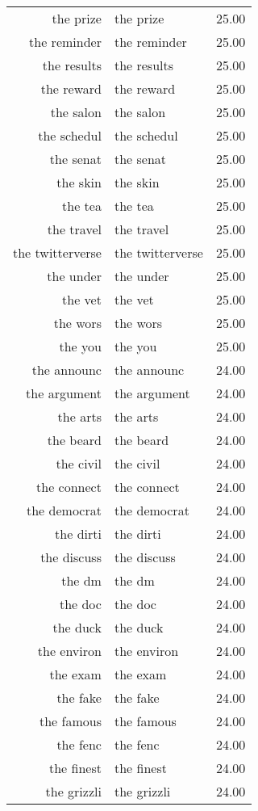 \begin{table}[ht]
\begin{tabular}{rlr}
  the prize & the prize & 25.00 \\ 
  the reminder & the reminder & 25.00 \\ 
  the results & the results & 25.00 \\ 
  the reward & the reward & 25.00 \\ 
  the salon & the salon & 25.00 \\ 
  the schedul & the schedul & 25.00 \\ 
  the senat & the senat & 25.00 \\ 
  the skin & the skin & 25.00 \\ 
  the tea & the tea & 25.00 \\ 
  the travel & the travel & 25.00 \\ 
  the twitterverse & the twitterverse & 25.00 \\ 
  the under & the under & 25.00 \\ 
  the vet & the vet & 25.00 \\ 
  the wors & the wors & 25.00 \\ 
  the you & the you & 25.00 \\ 
  the announc & the announc & 24.00 \\ 
  the argument & the argument & 24.00 \\ 
  the arts & the arts & 24.00 \\ 
  the beard & the beard & 24.00 \\ 
  the civil & the civil & 24.00 \\ 
  the connect & the connect & 24.00 \\ 
  the democrat & the democrat & 24.00 \\ 
  the dirti & the dirti & 24.00 \\ 
  the discuss & the discuss & 24.00 \\ 
  the dm & the dm & 24.00 \\ 
  the doc & the doc & 24.00 \\ 
  the duck & the duck & 24.00 \\ 
  the environ & the environ & 24.00 \\ 
  the exam & the exam & 24.00 \\ 
  the fake & the fake & 24.00 \\ 
  the famous & the famous & 24.00 \\ 
  the fenc & the fenc & 24.00 \\ 
  the finest & the finest & 24.00 \\ 
  the grizzli & the grizzli & 24.00 \\ 

\end{tabular}
\end{table}
